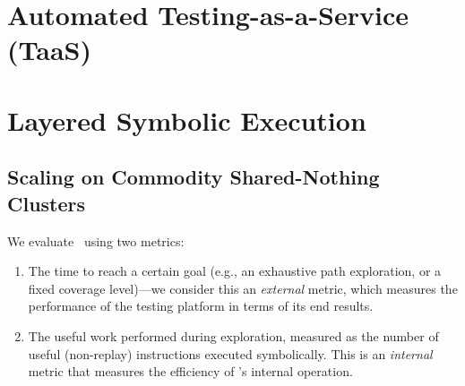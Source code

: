 \section{Automated Testing-as-a-Service (TaaS)}


\section{Layered Symbolic Execution}

\subsection{Scaling on Commodity Shared-Nothing Clusters}
\label{sec:scalability}

We evaluate \cnine\ using two metrics:
\begin{enumerate}
\item The time to reach a certain goal (e.g., an exhaustive path exploration, or a fixed coverage level)---we consider this an \emph{external} metric, which measures the performance of the testing platform in terms of its end results.
\item The useful work performed during exploration, measured as the number of useful (non-replay) instructions executed symbolically. This is an \emph{internal} metric that measures the efficiency of \cnine's internal operation. 
\end{enumerate}



